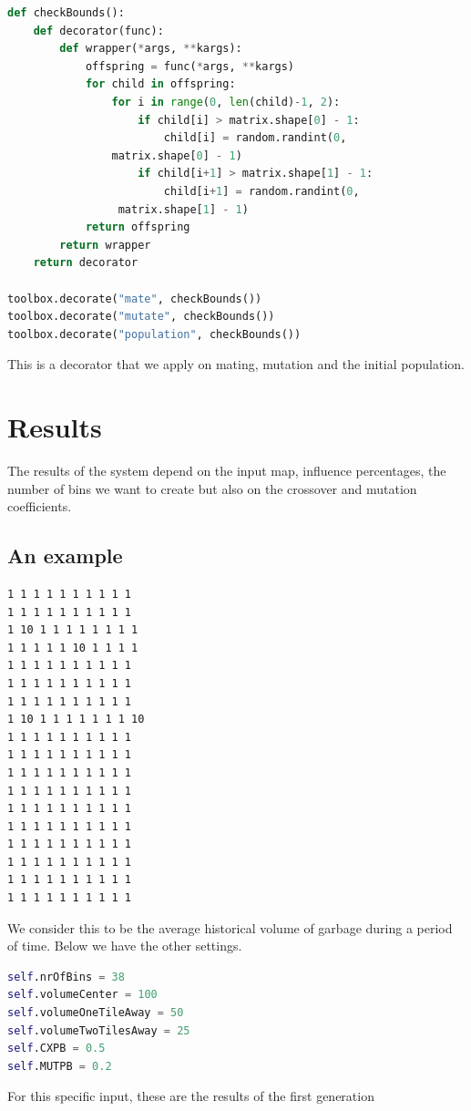 \documentclass[a4paper,12pt]{report}
\begin{document}
\begin{lstlisting}[language=Python]
def checkBounds():
    def decorator(func):
        def wrapper(*args, **kargs):
            offspring = func(*args, **kargs)
            for child in offspring:
                for i in range(0, len(child)-1, 2):
                    if child[i] > matrix.shape[0] - 1:
                        child[i] = random.randint(0,
				matrix.shape[0] - 1)
                    if child[i+1] > matrix.shape[1] - 1:
                        child[i+1] = random.randint(0,
				 matrix.shape[1] - 1) 
            return offspring
        return wrapper
    return decorator

toolbox.decorate("mate", checkBounds())
toolbox.decorate("mutate", checkBounds())
toolbox.decorate("population", checkBounds())
\end{lstlisting}

This is a decorator that we apply on mating, mutation and the initial population.

\chapter{Results}

The results of the system depend on the input map, influence percentages, the number of bins we want to create but also on the crossover and mutation coefficients.
\section {An example}

\begin{lstlisting}
1 1 1 1 1 1 1 1 1 1
1 1 1 1 1 1 1 1 1 1
1 10 1 1 1 1 1 1 1 1
1 1 1 1 1 10 1 1 1 1
1 1 1 1 1 1 1 1 1 1
1 1 1 1 1 1 1 1 1 1
1 1 1 1 1 1 1 1 1 1
1 10 1 1 1 1 1 1 1 10
1 1 1 1 1 1 1 1 1 1
1 1 1 1 1 1 1 1 1 1
1 1 1 1 1 1 1 1 1 1
1 1 1 1 1 1 1 1 1 1
1 1 1 1 1 1 1 1 1 1
1 1 1 1 1 1 1 1 1 1
1 1 1 1 1 1 1 1 1 1
1 1 1 1 1 1 1 1 1 1
1 1 1 1 1 1 1 1 1 1
1 1 1 1 1 1 1 1 1 1
\end{lstlisting}
We consider this to be the average historical volume of garbage during a period of time. Below we have the other settings.

\begin{lstlisting}[language=Python]
self.nrOfBins = 38
self.volumeCenter = 100
self.volumeOneTileAway = 50
self.volumeTwoTilesAway = 25
self.CXPB = 0.5
self.MUTPB = 0.2
\end{lstlisting}

For this specific input, these are the results of the first generation
\end{document}
